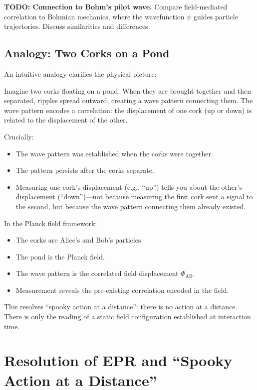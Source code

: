 \documentclass[11pt,a4paper]{article}
\theoremstyle{definition}
\theoremstyle{remark}
\begin{document}
\textbf{TODO: Connection to Bohm's pilot wave.} Compare field-mediated correlation to Bohmian mechanics, where the wavefunction $\psi$ guides particle trajectories. Discuss similarities and differences.

\subsection{Analogy: Two Corks on a Pond}
\label{sec:cork_analogy}

An intuitive analogy clarifies the physical picture:

Imagine two corks floating on a pond. When they are brought together and then separated, ripples spread outward, creating a wave pattern connecting them. The wave pattern encodes a correlation: the displacement of one cork (up or down) is related to the displacement of the other.

Crucially:
\begin{itemize}[leftmargin=*, itemsep=0.2em]
\item The wave pattern was established when the corks were together.
\item The pattern persists after the corks separate.
\item Measuring one cork's displacement (e.g., ``up'') tells you about the other's displacement (``down'')---not because measuring the first cork sent a signal to the second, but because the wave pattern connecting them already existed.
\end{itemize}

In the Planck field framework:
\begin{itemize}[leftmargin=*, itemsep=0.2em]
\item The corks are Alice's and Bob's particles.
\item The pond is the Planck field.
\item The wave pattern is the correlated field displacement $\Phi_{\mathrm{AB}}$.
\item Measurement reveals the pre-existing correlation encoded in the field.
\end{itemize}

This resolves ``spooky action at a distance'': there is no action at a distance. There is only the reading of a static field configuration established at interaction time.

\section{Resolution of EPR and ``Spooky Action at a Distance''}
\label{sec:epr_resolution}
\end{document}
